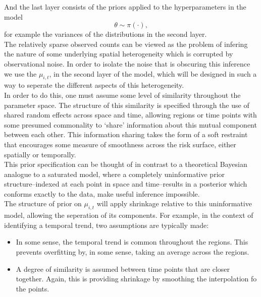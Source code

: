 \documentclass[11pt]{report}
\begin{document}
And the last layer consists of the priors applied to the hyperparameters in the model
\begin{equation}
\theta \sim \pi(\cdot),
\end{equation}
for example the variances of the distributions in the second layer. \\

The relatively sparse observed counts can be viewed as the problem of infering the nature of some underlying spatial heterogeneity which is corrupted by observational noise. In order to isolate the noise that is obscuring this inference we use the $\mu_{i,t}$, in the second layer of the model, which will be designed in such a way to seperate the different aspects of this heterogeneity. \\

In order to do this, one must assume some level of similarity throughout the parameter space. The structure of this similarity is specified through the use of shared random effects across space and time, allowing regions or time points with some presumed commonality to `share' information about this mutual component between each other. This information sharing takes the form of a soft restraint that encourages some measure of smoothness across the risk surface, either spatially or temporally. \\

This prior specification can be thought of in contrast to a theoretical Bayesian analogue to a saturated model, where a completely uninformative prior structure--indexed at each point in space and time--results in a posterior which conforms exactly to the data, make useful inference impossible. \\

The structure of prior on $\mu_{i,t}$ will apply shrinkage relative to this uninformative model, allowing the seperation of its components. For example, in the context of identifying a temporal trend, two assumptions are typically made: 
\begin{itemize}
\item In some sense, the temporal trend is common throughout the regions. This prevents overfitting by, in some sense, taking an average across the regions.
\item A degree of similarity is assumed between time points that are closer together. Again, this is providing shrinkage by smoothing the interpolation fo the points.  
\end{itemize}
\end{document}
